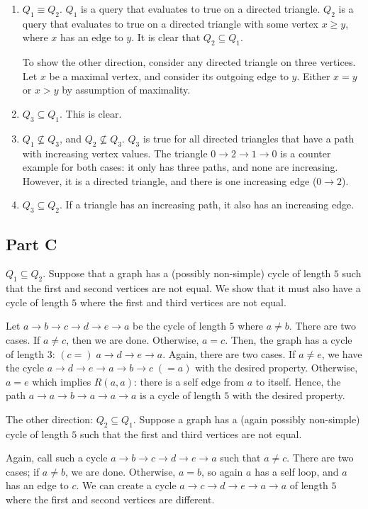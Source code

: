 \documentclass{article}
\begin{document}
\begin{enumerate}
    \item $Q_1 \equiv Q_2$. $Q_1$ is a query that evaluates to true on a
        directed triangle. $Q_2$ is a query that evaluates to true on a
        directed triangle with some vertex $x \geq y$, where $x$ has an edge to
        $y$. It is clear that $Q_2 \subseteq Q_1$.

        To show the other direction, consider any directed triangle on three
        vertices. Let $x$ be a maximal vertex, and consider its outgoing edge
        to $y$. Either $x = y$ or $x > y$ by assumption of maximality.

    \item $Q_3 \subseteq Q_1$. This is clear.

    \item $Q_1 \not\subseteq Q_3$, and $Q_2 \not\subseteq Q_3$. $Q_3$ is true
        for all directed triangles that have a path with increasing vertex
        values. The triangle $0 \to 2 \to 1 \to 0$ is a counter example for
        both cases: it only has three paths, and none are increasing. However,
        it is a directed triangle, and there is one increasing edge ($0 \to
        2$).

    \item $Q_3 \subseteq Q_2$. If a triangle has an increasing path, it also
        has an increasing edge.
\end{enumerate}

\subsection{Part C}

$Q_1 \subseteq Q_2$. Suppose that a graph has a (possibly non-simple) cycle of
length $5$ such that the first and second vertices are not equal. We show that
it must also have a cycle of length $5$ where the first and third vertices are
not equal.

Let $a \to b \to c \to d \to e \to a$ be the cycle of length $5$ where $a \neq
b$. There are two cases. If $a \neq c$, then we are done. Otherwise, $a = c$.
Then, the graph has a cycle of length $3$: $(c =)\;a \to d \to e \to a$. Again,
there are two cases. If $a \neq e$, we have the cycle $a \to d \to e \to a \to
b \to c\;(= a)$ with the desired property. Otherwise, $a = e$ which implies
$R(a, a)$: there is a self edge from $a$ to itself. Hence, the path $a \to a
\to b \to a \to a \to a$ is a cycle of length $5$ with the desired property.

\bigskip
The other direction: $Q_2 \subseteq Q_1$. Suppose a graph has a (again possibly
non-simple) cycle of length $5$ such that the first and third vertices are not
equal.

Again, call such a cycle $a \to b \to c \to d \to e \to a$ such that $a \neq
c$. There are two cases; if $a \neq b$, we are done. Otherwise, $a = b$, so
again $a$ has a self loop, and $a$ has an edge to $c$. We can create a cycle $a
\to c \to d \to e \to a \to a$ of length $5$ where the first and second
vertices are different.
\end{document}
